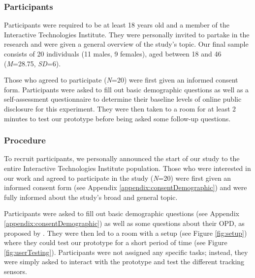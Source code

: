 \subsubsection{Participants}
Participants were required to be at least 18 years old and a member of the Interactive Technologies Institute. They were personally invited to partake in the research and were given a general overview of the study's topic. Our final sample consists of 20 individuals (11 males, 9 females), aged between 18 and 46 (\textit{M}=28.75, \textit{SD}=6).

Those who agreed to participate (\textit{N}=20) were first given an informed consent form. Participants were asked to fill out basic demographic questions as well as a self-assessment questionnaire to determine their baseline levels of online public disclosure for this experiment. They were then taken to a room for at least 2 minutes to test our prototype before being asked some follow-up questions.

\subsubsection{Procedure}
To recruit participants, we personally announced the start of our study to the entire Interactive Technologies Institute population. Those who were interested in our work and agreed to participate in the study (\textit{N}=20) were first given an informed consent form (see Appendix \ref{appendix:consentDemographic}) and were fully informed about the study's broad and general topic.

Participants were asked to fill out basic demographic questions (see Appendix \ref{appendix:consentDemographic}) as well as some questions about their OPD, as proposed by \cite{YUN06}. They were then led to a room with a setup (see Figure \ref{fig:setup}) where they could test our prototype for a short period of time (see Figure \ref{fig:userTesting}). Participants were not assigned any specific tasks; instead, they were simply asked to interact with the prototype and test the different tracking sensors.


